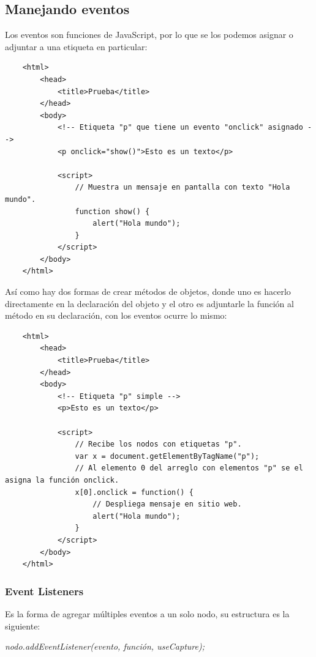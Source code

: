 \subsection{Manejando eventos}
\hspace{0.55cm}Los eventos son funciones de JavaScript, por lo que se los podemos asignar o adjuntar a una etiqueta en particular:
\begin{lstlisting}
    <html>
        <head>
            <title>Prueba</title>
        </head>
        <body>
            <!-- Etiqueta "p" que tiene un evento "onclick" asignado -->
            <p onclick="show()">Esto es un texto</p>
            
            <script>
                // Muestra un mensaje en pantalla con texto "Hola mundo".
                function show() {
                    alert("Hola mundo");
                }
            </script>
        </body>
    </html>
\end{lstlisting}

Así como hay dos formas de crear métodos de objetos, donde uno es hacerlo directamente en la declaración del objeto y el otro es adjuntarle la función al método en su declaración, con los eventos ocurre lo mismo:
\begin{lstlisting}
    <html>
        <head>
            <title>Prueba</title>
        </head>
        <body>
            <!-- Etiqueta "p" simple -->
            <p>Esto es un texto</p>
            
            <script>
                // Recibe los nodos con etiquetas "p".
                var x = document.getElementByTagName("p");
                // Al elemento 0 del arreglo con elementos "p" se el asigna la función onclick.
                x[0].onclick = function() {
                    // Despliega mensaje en sitio web.
                    alert("Hola mundo");
                }
            </script>
        </body>
    </html>
\end{lstlisting}


\subsubsection{Event Listeners}
\hspace{0.55cm}Es la forma de agregar múltiples eventos a un solo nodo, su estructura es la siguiente:
\begin{center}
    \textit{nodo.addEventListener(evento, función, useCapture);}
\end{center}

